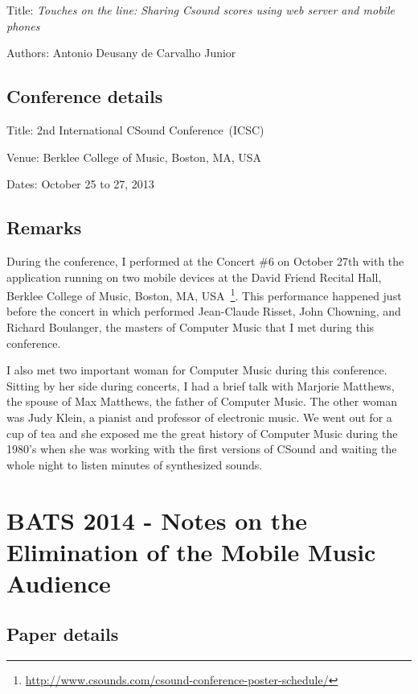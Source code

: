 Title: \textit{Touches on the line: Sharing Csound scores using web server and mobile phones}

Authors: Antonio Deusany de Carvalho Junior

\subsection*{Conference details}

Title: 2nd International CSound Conference~(ICSC)

Venue: Berklee College of Music, Boston, MA, USA

Dates: October 25 to 27, 2013

\subsection*{Remarks}

During the conference, I performed at the Concert \#6 on October 27th with the application running on two mobile devices at the David Friend Recital Hall, Berklee College of Music, Boston, MA, USA~\footnote{\url{http://www.csounds.com/csound-conference-poster-schedule/}}.
This performance happened just before the concert in which performed Jean-Claude Risset, John Chowning, and Richard Boulanger, the masters of Computer Music that I met during this conference.

I also met two important woman for Computer Music during this conference.
Sitting by her side during concerts, I had a brief talk with Marjorie Matthews, the spouse of Max Matthews, the father of Computer Music.
The other woman was Judy Klein, a pianist and professor of electronic music.
We went out for a cup of tea and she exposed me the great history of Computer Music during the 1980's when she was working with the first versions of CSound and waiting the whole night to listen minutes of synthesized sounds.



\section{BATS 2014 - Notes on the Elimination of the Mobile Music Audience}
\label{ape:paperbats2014}

\subsection*{Paper details}

